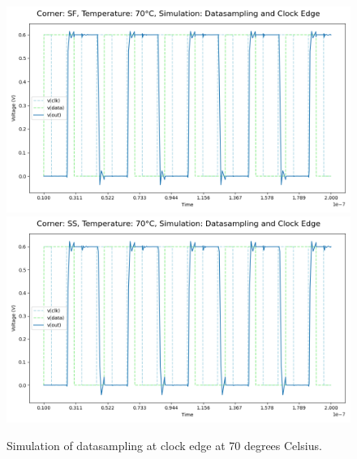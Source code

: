 \begin{figure}[H]
    \vspace{5pt}
    \includegraphics[height= 0.21\textheight]{figures/aimspice/0.600_0.1u_0.1u_0.3u_0.1u/functionality/SF70W1.png}
    \vspace{5pt}
    \includegraphics[height= 0.21\textheight]{figures/aimspice/0.600_0.1u_0.1u_0.3u_0.1u/functionality/SS70W1.png}
    \caption{Simulation of datasampling at clock edge at 70 degrees Celsius.}
    \label{fig:aimspice_W1_70}
\end{figure}

\pagebreak

